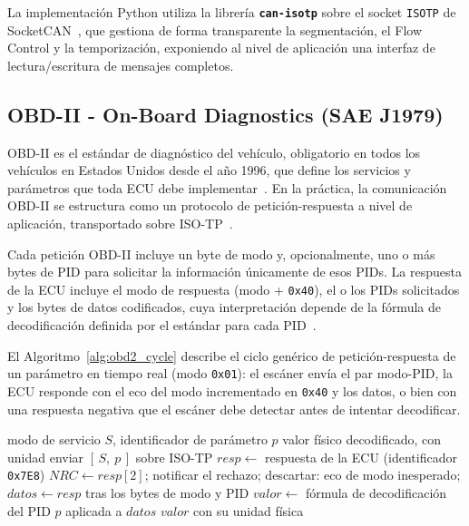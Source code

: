 La implementación Python utiliza la librería \textbf{\texttt{can-isotp}} sobre el socket \texttt{ISOTP} de SocketCAN~\cite{LinuxKernel_ISOTP}, que gestiona de forma transparente la segmentación, el Flow Control y la temporización, exponiendo al nivel de aplicación una interfaz de lectura/escritura de mensajes completos.

\subsection{OBD-II - On-Board Diagnostics (SAE J1979)}
\label{sec:proto_obd2}

OBD-II es el estándar de diagnóstico del vehículo, obligatorio en todos los vehículos en Estados Unidos desde el año 1996, que define los servicios y parámetros que toda ECU debe implementar~\cite{SAEJ1979:2014, CARB_OBDII}. En la práctica, la comunicación OBD-II se estructura como un protocolo de petición-respuesta a nivel de aplicación, transportado sobre ISO-TP~\cite{ISO15765-4:2021}.

\begin{table}[!htbp]
\caption{Estructura de trama OBD-II: petición (CAN ID \texttt{0x7E0}) y respuesta (CAN ID \texttt{0x7E8}) para el PID \texttt{0x0C} (RPM) según SAE~J1979~\cite{SAEJ1979:2014}.}
\label{tab:obd2_format}

\end{table}

Cada petición OBD-II incluye un byte de modo y, opcionalmente, uno o más bytes de PID para solicitar la información únicamente de esos PIDs. La respuesta de la ECU incluye el modo de respuesta (modo + \texttt{0x40}), el o los PIDs solicitados y los bytes de datos codificados, cuya interpretación depende de la fórmula de decodificación definida por el estándar para cada PID~\cite{SAEJ1979:2014}.

El Algoritmo~\ref{alg:obd2_cycle} describe el ciclo genérico de petición-respuesta de un parámetro en tiempo real (modo \texttt{0x01}): el escáner envía el par modo-PID, la ECU responde con el eco del modo incrementado en \texttt{0x40} y los datos, o bien con una respuesta negativa que el escáner debe detectar antes de intentar decodificar.

\begin{algorithm}[H]
\caption{Ciclo de petición-respuesta de un parámetro OBD-II (SAE~J1979).}
\label{alg:obd2_cycle}
\begin{algorithmic}[1]
\Require modo de servicio $S$, identificador de parámetro $p$
\Ensure valor físico decodificado, con unidad
\State enviar $[\,S,\ p\,]$ sobre ISO-TP 
\State $resp \gets$ respuesta de la ECU (identificador \texttt{0x7E8})
 
    \State $NRC \gets resp[2]$; notificar el rechazo; \Return
{}
    \State descartar: eco de modo inesperado; \Return
\EndIf
\State $datos \gets resp$ tras los bytes de modo y PID
\State $valor \gets$ fórmula de decodificación del PID $p$ aplicada a $datos$
\State \Return $valor$ con su unidad física
\end{algorithmic}
\end{algorithm}


